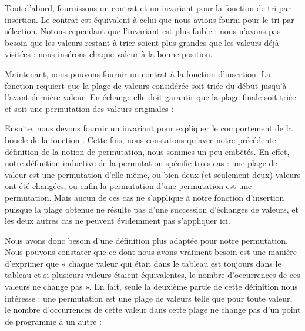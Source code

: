 Tout d'abord, fournissons un contrat et un invariant pour la fonction de tri
par insertion. Le contrat est équivalent à celui que nous avions fourni pour le
tri par sélection. Notons cependant que l'invariant est plus faible : nous
n'avons pas besoin que les valeurs restant à trier soient plus grandes que les
valeurs déjà visitées : nous insérons chaque valeur à la bonne position.






Maintenant, nous pouvons fournir un contrat à la fonction d'insertion. La
fonction requiert que la plage de valeurs considérée soit triée du début jusqu'à
l'avant-dernière valeur. En échange elle doit garantir que la plage finale soit
triée et soit une permutation des valeurs originales :






Ensuite, nous devons fournir un invariant pour expliquer le comportement
de la boucle de la fonction . Cette fois, nous constatons
qu'avec notre précédente définition de la notion de permutation, nous sommes un
peu embêtés. En effet, notre définition inductive de la permutation spécifie trois
cas : une plage de valeur est une permutation d'elle-même, ou bien deux (et seulement
deux) valeurs ont été changées, ou enfin la permutation d'une permutation est
une permutation. Mais aucun de ces cas ne s'applique à notre fonction
d'insertion puisque la plage obtenue ne résulte pas d'une succession d'échanges de
valeurs, et les deux autres cas ne peuvent évidemment pas s'appliquer ici.



Nous avons donc besoin d'une définition plus adaptée pour notre permutation. Nous
pouvons constater que ce dont nous avons vraiment besoin est une manière d'exprimer
que « chaque valeur qui était dans le tableau est toujours dans le tableau et
si plusieurs valeurs étaient équivalentes, le nombre d'occurrences de ces valeurs
ne change pas ». En fait, seule la deuxième partie de cette définition nous
intéresse : une permutation est une plage de valeurs telle que pour toute valeur,
le nombre d'occurrences de cette valeur dans cette plage ne change pas d'un point
de programme à un autre :






